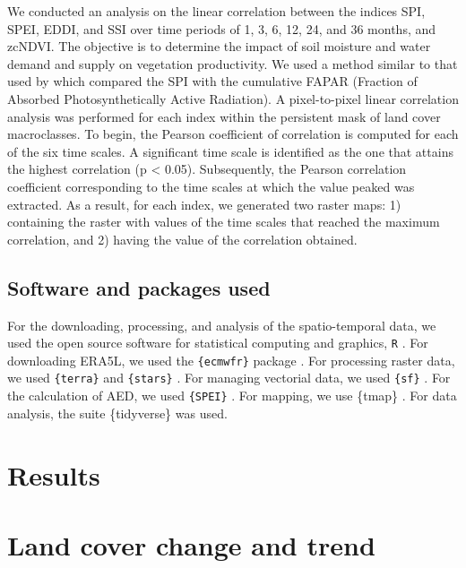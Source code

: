 \documentclass[
  authoryear,
  preprint,
  3p,
  onecolumn]{elsarticle}
\begin{document}
We conducted an analysis on the linear correlation between the indices
SPI, SPEI, EDDI, and SSI over time periods of 1, 3, 6, 12, 24, and 36
months, and zcNDVI. The objective is to determine the impact of soil
moisture and water demand and supply on vegetation productivity. We used
a method similar to that used by \citet{Meroni2017} which compared the
SPI with the cumulative FAPAR (Fraction of Absorbed Photosynthetically
Active Radiation). A pixel-to-pixel linear correlation analysis was
performed for each index within the persistent mask of land cover
macroclasses. To begin, the Pearson coefficient of correlation is
computed for each of the six time scales. A significant time scale is
identified as the one that attains the highest correlation (p
\textless{} 0.05). Subsequently, the Pearson correlation coefficient
corresponding to the time scales at which the value peaked was
extracted. As a result, for each index, we generated two raster maps: 1)
containing the raster with values of the time scales that reached the
maximum correlation, and 2) having the value of the correlation
obtained.

\hypertarget{software-and-packages-used}{%
\subsection{Software and packages
used}\label{software-and-packages-used}}

For the downloading, processing, and analysis of the spatio-temporal
data, we used the open source software for statistical computing and
graphics, \texttt{R} \citep{R2023}. For downloading ERA5L, we used the
\texttt{\{ecmwfr\}} package \citep{Hufkens2019}. For processing raster
data, we used \texttt{\{terra\}} \citep{Hijmans2023} and
\texttt{\{stars\}} \citep{Pebesma2023}. For managing vectorial data, we
used \texttt{\{sf\}} \citep{Pebesma2018}. For the calculation of AED, we
used \texttt{\{SPEI\}} \citep{Bergueria2023}. For mapping, we use
\{tmap\} \citep{Tennekes2018}. For data analysis, the suite
\{tidyverse\} \citep{Wickham2019} was used.

\hypertarget{results}{%
\section{Results}\label{results}}

\hypertarget{land-cover-change-and-trend-1}{%
\section{Land cover change and
trend}\label{land-cover-change-and-trend-1}}
\end{document}
